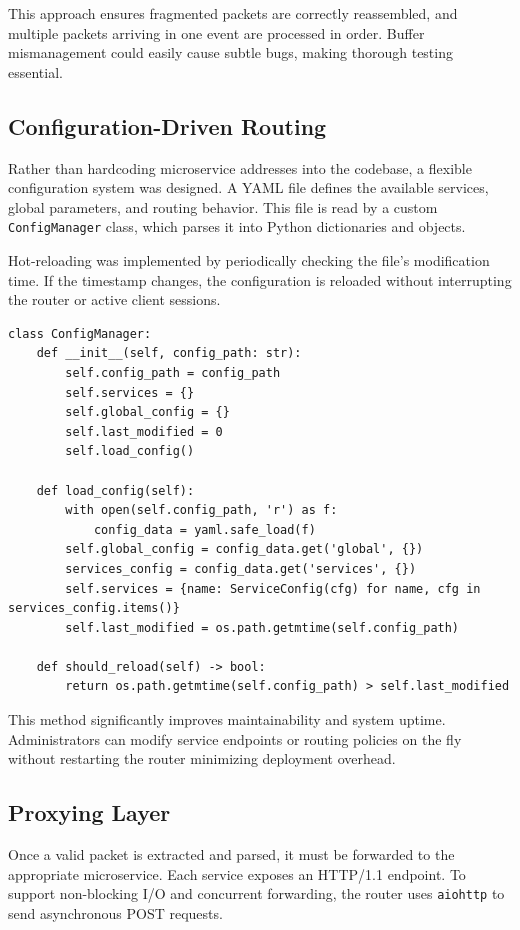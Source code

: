 This approach ensures fragmented packets are correctly reassembled, and multiple packets arriving in one event are processed in order. Buffer mismanagement could easily cause subtle bugs, making thorough testing essential.

\subsection{Configuration-Driven Routing}

Rather than hardcoding microservice addresses into the codebase, a flexible configuration system was designed. A YAML file defines the available services, global parameters, and routing behavior. This file is read by a custom \texttt{ConfigManager} class, which parses it into Python dictionaries and objects.

Hot-reloading was implemented by periodically checking the file’s modification time. If the timestamp changes, the configuration is reloaded without interrupting the router or active client sessions.

\begin{lstlisting}[breaklines=true,basicstyle=\small\ttfamily,frame=single]
class ConfigManager:
    def __init__(self, config_path: str):
        self.config_path = config_path
        self.services = {}
        self.global_config = {}
        self.last_modified = 0
        self.load_config()

    def load_config(self):
        with open(self.config_path, 'r') as f:
            config_data = yaml.safe_load(f)
        self.global_config = config_data.get('global', {})
        services_config = config_data.get('services', {})
        self.services = {name: ServiceConfig(cfg) for name, cfg in services_config.items()}
        self.last_modified = os.path.getmtime(self.config_path)

    def should_reload(self) -> bool:
        return os.path.getmtime(self.config_path) > self.last_modified
\end{lstlisting}

This method significantly improves maintainability and system uptime. Administrators can modify service endpoints or routing policies on the fly without restarting the router minimizing deployment overhead.

\subsection{Proxying Layer}

Once a valid packet is extracted and parsed, it must be forwarded to the appropriate microservice. Each service exposes an HTTP/1.1 endpoint. To support non-blocking I/O and concurrent forwarding, the router uses \texttt{aiohttp} to send asynchronous POST requests.

